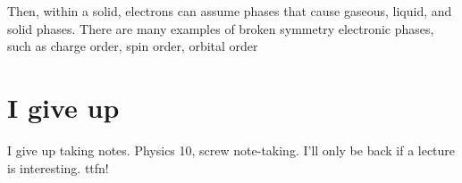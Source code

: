 \documentclass{report}
\begin{document}
Then, within a solid, electrons can assume phases that cause gaseous, liquid, and solid phases. There are many examples of broken symmetry electronic phases, such as charge order, spin order, orbital order

\section{I give up}
I give up taking notes. Physics 10, screw note-taking. I'll only be back if a lecture is interesting. ttfn!
\end{document}

